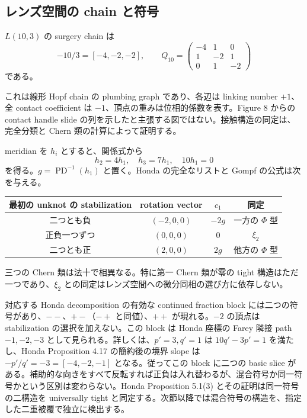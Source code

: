 \documentclass[12pt]{amsart}
\theoremstyle{definition}
\theoremstyle{remark}
\numberwithin{equation}{section}
\theoremstyle{definition}
\begin{document}
\subsection{レンズ空間の chain と符号}
$L(10,3)$ の surgery chain は
\[
-10/3=[-4,-2,-2],\qquad
Q_{10}=\begin{pmatrix}-4&1&0\\1&-2&1\\0&1&-2\end{pmatrix}
\]
である。
\begin{center}
\end{center}
これは線形 Hopf chain の plumbing graph であり、各辺は linking number $+1$、全 contact coefficient は $-1$、頂点の重みは位相的係数を表す。Figure 8 からの contact handle slide の列を示したと主張する図ではない。接触構造の同定は、完全分類と Chern 類の計算によって証明する。

meridian を $h_i$ とすると、関係式から
\[
h_2=4h_1,\quad h_3=7h_1,\quad10h_1=0
\]
を得る。$g=\operatorname{PD}^{-1}(h_1)$ と置く。Honda の完全なリストと Gompf の公式は次を与える。
\begin{center}
\begin{tabular}{cccc}\toprule
最初の unknot の stabilization & rotation vector & $c_1$ & 同定\\\midrule
二つとも負 & $(-2,0,0)$ & $-2g$ & 一方の $\Phi$ 型\\
正負一つずつ & $(0,0,0)$ & $0$ & $\xi_2$\\
二つとも正 & $(2,0,0)$ & $2g$ & 他方の $\Phi$ 型\\\bottomrule
\end{tabular}
\end{center}
三つの Chern 類は法十で相異なる。特に第一 Chern 類が零の tight 構造はただ一つであり、$\xi_2$ との同定はレンズ空間への微分同相の選び方に依存しない。

対応する Honda decomposition の有効な continued fraction block には二つの符号があり、$--$、$+-$（$-+$ と同値）、$++$ が現れる。$-2$ の頂点は stabilization の選択を加えない。この block は Honda 座標の Farey 隣接 path $-1,-2,-3$ として見られる。詳しくは、$p'=3,q'=1$ は $10q'-3p'=1$ を満たし、Honda Proposition 4.17 の簡約後の境界 slope は $-p'/q'=-3=[-4,-2,-1]$ となる。従ってこの block に二つの basic slice がある。補助的な向きをすべて反転すれば正負は入れ替わるが、混合符号か同一符号かという区別は変わらない。Honda Proposition 5.1(3) とその証明は同一符号の二構造を universally tight と同定する。次節以降では混合符号の構造を、指定した二重被覆で独立に検出する。
\end{document}
